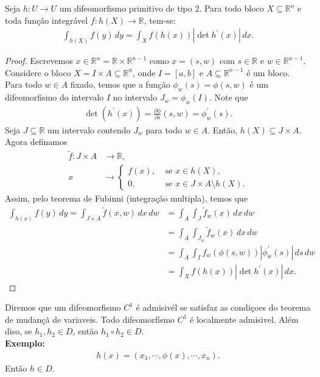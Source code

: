 \begin{theorem}
  Seja $h:U\to U$ um difeomorfismo primitivo de tipo 2. Para todo bloco $X\subseteq\mathbb{R}^{n}$ e toda função integrável $f:h(X)\to\mathbb{R}$, tem-se:
  \begin{align*}
    \int_{h(X)}f(y)\,dy=\int_{X}f(h(x))|\det h^{\prime}(x)|\,dx.
  \end{align*}
\end{theorem}
\begin{proof} 
  Escrevemos $x\in\mathbb{R}^{n}=\mathbb{R}\times\mathbb{R}^{n-1}$ como $x=(s,w)$ com $s\in\mathbb{R}$ e $w\in\mathbb{R}^{n-1}$. Considere o bloco $X=I\times A\subseteq\mathbb{R}^{n}$, onde $I=[a,b]$ e $A\subseteq \mathbb{R}^{n-1}$ é um bloco.\\
  Para todo $w\in A$ fixado, temos que a função $\phi_{w}(s)=\phi(s,w)$ é um difeomorfismo do intervalo $I$ no intervalo $J_w=\phi_{w}(I)$. Note que
  \begin{align*}
    \det(h^{\prime}(x))=\frac{\partial \phi}{\partial s}(s,w)=\phi_w^{\prime}(s).
  \end{align*}
  Seja $J\subseteq\mathbb{R}$ um intervalo contendo $J_w$ para todo $w\in A$. Então, $h(X)\subseteq J\times A$. Agora definamos
  \begin{align*}
    \tilde{f}:J\times A&\to\mathbb{R},\\
                      x&\to\begin{cases}
                        f(x), &\text{ se } x\in h(X) \text{,} \\
                        0, &\text{ se } x\in J\times A\setminus h(X).
                      \end{cases}
  \end{align*}
  Assim, pelo teorema de Fubinni (integração multipla), temos que
  \begin{align*}
    \int_{h(x)}f(y)\,dy=\int_{J\times A}\tilde{f}(x,w)\,dx\,dw&=\int_{A}\int_{J}\tilde{f}_{w}(x)\,dx\,dw\\
    &=\int_{A}\int_{J_w}\tilde{f}_w(x)\,dx\,dw\\
    &=\int_{A}\int_{I}f_w(\phi(s,w))|\phi_w^{\prime}(s)|\,ds\,dw\\
    &=\int_{X}f(h(x))|\det h^{\prime}(x)|\,dx.
  \end{align*}
\end{proof}
\begin{note}
  Diremos que um difeomorfismo $C^{1}$ é admisivél se satisfaz as condiçoes do teorema de mudançã de variaveis. Todo difeomorfísmo $C^{1}$ é localmente admisivel. Além diso, se $h_1,h_2\in D$, então $h_1\circ h_2\in D$.\\
  \textbf{Exemplo:}\\
  \begin{align*}
    h(x)=\left( x_1,\cdots,\phi(x),\cdots,x_n \right).
  \end{align*}
  Então $h\in D$.
\end{note}
